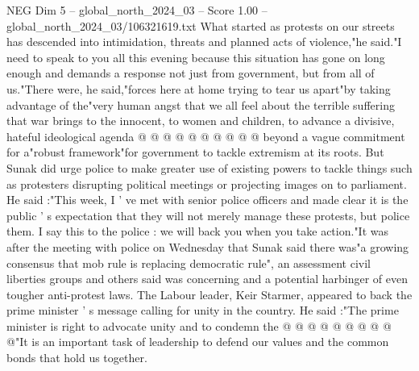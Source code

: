 \begin{textsample}{NEG Dim 5 – global\_north\_2024\_03 – Score 1.00 – global\_north\_2024\_03/106321619.txt}
What started as protests on our streets has descended into intimidation, threats and planned acts of violence,"he said."I need to speak to you all this evening because this situation has gone on long enough and demands a response not just from government, but from all of us."There were, he said,"forces here at home trying to tear us apart"by taking advantage of the"very human angst that we all feel about the terrible suffering that war brings to the innocent, to women and children, to advance a divisive, hateful ideological agenda @ @ @ @ @ @ @ @ @ @ beyond a vague commitment for a"robust framework"for government to tackle extremism at its roots.
But Sunak did urge police to make greater use of existing powers to tackle things such as protesters disrupting political meetings or projecting images on to parliament.
He said :"This week, I ' ve met with senior police officers and made clear it is the public ' s expectation that they will not merely manage these protests, but police them.
I say this to the police : we will back you when you take action."It was after the meeting with police on Wednesday that Sunak said there was"a growing consensus that mob rule is replacing democratic rule", an assessment civil liberties groups and others said was concerning and a potential harbinger of even tougher anti-protest laws.
The Labour leader, Keir Starmer, appeared to back the prime minister ' s message calling for unity in the country.
He said :"The prime minister is right to advocate unity and to condemn the @ @ @ @ @ @ @ @ @ @"It is an important task of leadership to defend our values and the common bonds that hold us together.

\end{textsample}
